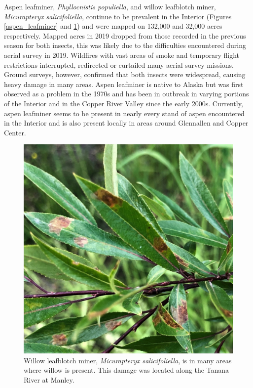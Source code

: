 Aspen leafminer, \textit{Phyllocnistis populiella}, and willow leafblotch miner, \textit{Micurapteryx salicifoliella}, continue to be prevalent in the Interior (Figures \ref{aspen_leafminer} and \ref{willow_leafblotch_miner}) and were mapped on 132,000 and 32,000 acres respectively. Mapped acres in 2019 dropped from those recorded in the previous season for both insects, this was likely due to the difficulties encountered during aerial survey in 2019. Wildfires with vast areas of smoke and temporary flight restrictions interrupted, redirected or curtailed many aerial survey missions. Ground surveys, however, confirmed that both insects were widespread, causing heavy damage in many areas. Aspen leafminer is native to Alaska but was first observed as a problem in the 1970s and has been in outbreak in varying portions of the Interior and in the Copper River Valley since the early 2000s. Currently, aspen leafminer seems to be present in nearly every stand of aspen encountered in the Interior and is also present locally in areas around Glennallen and Copper Center. 

\begin{figure}[H]
\begin{center}
\vspace{2mm}
\includegraphics[width=\textwidth]{img/willow_leafblotch_miner.jpg}
\caption{Willow leafblotch miner, \textit{Micurapteryx salicifoliella}, is in many areas where willow is present. This damage was located along the Tanana River at Manley.}
\label{willow_leafblotch_miner}
\end{center}
\end{figure} 

